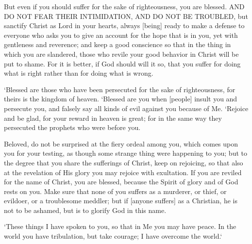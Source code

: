 \begin{scripture}[1 Peter 3:14-17]
    But even if you should suffer for the sake of righteousness, 
    you are blessed. AND DO NOT FEAR THEIR INTIMIDATION, AND DO NOT BE TROUBLED,
    but sanctify Christ as Lord in your hearts, always [being] ready to make a defense to everyone who asks you to give an account for the hope that is in you, yet with gentleness and reverence;
    and keep a good conscience so that in the thing in which you are slandered, those who revile your good behavior in Christ will be put to shame.
    For it is better, if God should will it so, that you suffer for doing what is right rather than for doing what is wrong.
\end{scripture}

\vspace{2\baselineskip}

\begin{scripture}[Matthew 5:10-12]
    `Blessed are those who have been persecuted for the sake of righteousness, for theirs is the kingdom of heaven.
    `Blessed are you when [people] insult you and persecute you, and falsely say all kinds of evil against you because of Me.
    `Rejoice and be glad, for your reward in heaven is great; for in the same way they persecuted the prophets who were before you.
\end{scripture}

\vspace{2\baselineskip}

\begin{scripture}[1 Peter 4:12-16]
    Beloved, do not be surprised at the fiery ordeal among you, which comes upon you for your testing, as though some strange thing were happening to you;
    but to the degree that you share the sufferings of Christ, keep on rejoicing, so that also at the revelation of His glory you may rejoice with exultation.
    If you are reviled for the name of Christ, you are blessed, because the Spirit of glory and of God rests on you.
    Make sure that none of you suffers as a murderer, or thief, or evildoer, or a troublesome meddler;
    but if [anyone suffers] as a Christian, he is not to be ashamed, but is to glorify God in this name.
\end{scripture}

\vspace{2\baselineskip}

\begin{scripture}[John 16:33]
    `These things I have spoken to you, so that in Me you may have peace. In the world you have tribulation, but take courage; I have overcome the world.`
\end{scripture}

